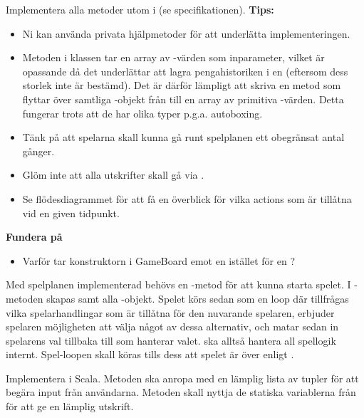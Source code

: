 \Task Implementera alla metoder utom  i  (se specifikationen).
\newline
\newline
\textbf{Tips:}

\begin{itemize}
\item Ni kan använda privata hjälpmetoder för att underlätta implementeringen.
\item Metoden  i klassen  tar en array av -värden som inparameter, vilket är opassande då det underlättar att lagra penga\-historiken i en  (eftersom dess storlek inte är bestämd). Det är därför lämpligt att skriva en metod som flyttar över samtliga -objekt från  till en array av primitiva -värden. Detta fungerar trots att de har olika typer p.g.a. autoboxing.
\item Tänk på att spelarna skall kunna gå runt spelplanen ett obegränsat antal gånger.
\item Glöm inte att alla utskrifter skall gå via  .
\item Se flödesdiagrammet för att få en överblick för vilka actions som är tillåtna vid en given tidpunkt.
\end{itemize}

\textbf{Fundera på}
\begin{itemize}
\item Varför tar konstruktorn i GameBoard emot en  istället för en ?
\end{itemize}

\Task Med spelplanen implementerad behövs en -metod för att kunna starta spelet. I -metoden skapas  samt alla -objekt. Spelet körs sedan som en loop där  tillfrågas vilka spelarhandlingar som är tillåtna för den nuvarande spelaren, erbjuder spelaren möjligheten att välja något av dessa alternativ, och matar sedan in spelarens val tillbaka till  som hanterar valet.  ska alltså hantera all spellogik internt.  Spel-loopen skall köras tills dess att spelet är över enligt . 

\Subtask Implementera  i Scala. Metoden ska anropa  med en lämplig lista av tupler för att begära input från användarna. Metoden  skall nyttja de statiska variablerna från  för att ge en lämplig utskrift.

